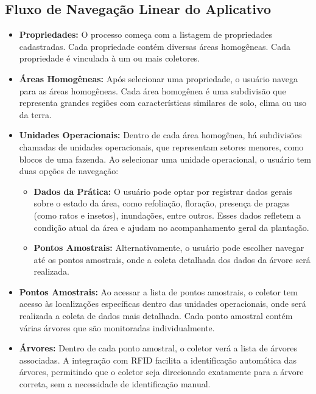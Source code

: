\subsection{Fluxo de Navegação Linear do Aplicativo}
\begin{itemize}
    \item \textbf{Propriedades:} O processo começa com a listagem de propriedades cadastradas. Cada propriedade contém diversas áreas homogêneas. Cada propriedade é vinculada à um ou mais coletores.

    \item \textbf{Áreas Homogêneas:} Após selecionar uma propriedade, o usuário navega para as áreas homogêneas. Cada área homogênea é uma subdivisão que representa grandes regiões com características similares de solo, clima ou uso da terra.

    \item \textbf{Unidades Operacionais:} Dentro de cada área homogênea, há subdivisões chamadas de unidades operacionais, que representam setores menores, como blocos de uma fazenda. Ao selecionar uma unidade operacional, o usuário tem duas opções de navegação:
    \begin{itemize}
        \item \textbf{Dados da Prática:} O usuário pode optar por registrar dados gerais sobre o estado da área, como refoliação, floração, presença de pragas (como ratos e insetos), inundações, entre outros. Esses dados refletem a condição atual da área e ajudam no acompanhamento geral da plantação.

        \item \textbf{Pontos Amostrais:} Alternativamente, o usuário pode escolher navegar até os pontos amostrais, onde a coleta detalhada dos dados da árvore será realizada.
    \end{itemize}

    \item \textbf{Pontos Amostrais:} Ao acessar a lista de pontos amostrais, o coletor tem acesso às localizações específicas dentro das unidades operacionais, onde será realizada a coleta de dados mais detalhada. Cada ponto amostral contém várias árvores que são monitoradas individualmente.

    \item \textbf{Árvores:} Dentro de cada ponto amostral, o coletor verá a lista de árvores associadas. A integração com RFID facilita a identificação automática das árvores, permitindo que o coletor seja direcionado exatamente para a árvore correta, sem a necessidade de identificação manual.


\end{itemize}
